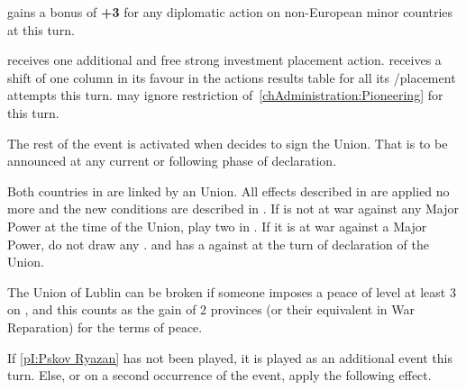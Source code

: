 
\phdipl
\aparag \SPA gains a bonus of {\bf +3} for any diplomatic action on
non-European minor countries at this turn.

\phadm
\aparag \SPA receives one additional and free strong investment \COL placement
action.
\aparag \SPA receives a shift of one column in its favour in the actions
results table for all its \COL/\TP placement attempts this turn.
\aparag \SPA may ignore restriction of~\ref{chAdministration:Pioneering} for
this turn.






\activation{}
\aparag The rest of the event is activated when \POL decides to sign the
Union. That is to be announced at any current or following phase of
declaration.

\phdipl
\aparag Both countries in \POL are linked by an Union. All effects described
in  are applied no more and the new
conditions are described in .
\aparag If \POL is not at war against any Major Power at the time of the
Union, play two \REVOLT in \POL. If it is at war against a Major Power, do not
draw any \REVOLT .
\aparag \RUS and \SUE has a \CB against \POL at the turn of declaration of the
Union.

\effetlong
\aparag The Union of Lublin can be broken if someone imposes a peace of level
at least 3 on \POL, and this counts as the gain of 2 provinces (or their
equivalent in War Reparation) for the terms of peace.






\phevnt
\aparag If \ref{pI:Pskov Ryazan} has not been played, it is played as an
additional event this turn.
\aparag Else, or on a second occurrence of the event, apply the following
effect.

